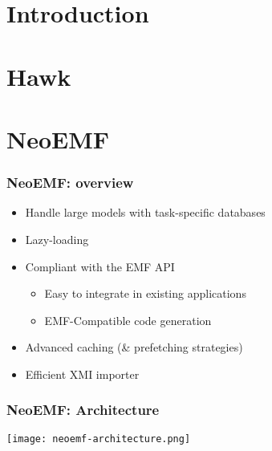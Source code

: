 



\maketitle

\section{Introduction}
\section{Hawk}

\section{NeoEMF}

\begin{frame}[c]\frametitle{NeoEMF: overview}
	\begin{itemize}
	\item Handle large models with task-specific databases
	\item Lazy-loading
	\item Compliant with the EMF API
	\begin{itemize}
		\item Easy to integrate in existing applications
		\item EMF-Compatible code generation
	\end{itemize}
	\item Advanced caching (\& prefetching strategies)
	\item Efficient XMI importer
	\end{itemize}
\end{frame}

\begin{frame}[t]\frametitle{NeoEMF: Architecture}
  \begin{center}
    \texttt{[image: neoemf-architecture.png]}
  \end{center}
\end{frame}

